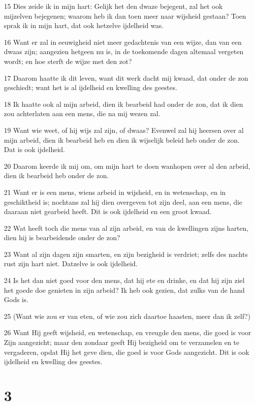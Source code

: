 \par 15 Dies zeide ik in mijn hart: Gelijk het den dwaze bejegent, zal het ook mijzelven bejegenen; waarom heb ik dan toen meer naar wijsheid gestaan? Toen sprak ik in mijn hart, dat ook hetzelve ijdelheid was.
\par 16 Want er zal in eeuwigheid niet meer gedachtenis van een wijze, dan van een dwaas zijn; aangezien hetgeen nu is, in de toekomende dagen altemaal vergeten wordt; en hoe sterft de wijze met den zot?
\par 17 Daarom haatte ik dit leven, want dit werk dacht mij kwaad, dat onder de zon geschiedt; want het is al ijdelheid en kwelling des geestes.
\par 18 Ik haatte ook al mijn arbeid, dien ik bearbeid had onder de zon, dat ik dien zou achterlaten aan een mens, die na mij wezen zal.
\par 19 Want wie weet, of hij wijs zal zijn, of dwaas? Evenwel zal hij heersen over al mijn arbeid, dien ik bearbeid heb en dien ik wijselijk beleid heb onder de zon. Dat is ook ijdelheid.
\par 20 Daarom keerde ik mij om, om mijn hart te doen wanhopen over al den arbeid, dien ik bearbeid heb onder de zon.
\par 21 Want er is een mens, wiens arbeid in wijsheid, en in wetenschap, en in geschiktheid is; nochtans zal hij dien overgeven tot zijn deel, aan een mens, die daaraan niet gearbeid heeft. Dit is ook ijdelheid en een groot kwaad.
\par 22 Wat heeft toch die mens van al zijn arbeid, en van de kwellingen zijns harten, dien hij is bearbeidende onder de zon?
\par 23 Want al zijn dagen zijn smarten, en zijn bezigheid is verdriet; zelfs des nachts rust zijn hart niet. Datzelve is ook ijdelheid.
\par 24 Is het dan niet goed voor den mens, dat hij ete en drinke, en dat hij zijn ziel het goede doe genieten in zijn arbeid? Ik heb ook gezien, dat zulks van de hand Gods is.
\par 25 (Want wie zou er van eten, of wie zou zich daartoe haasten, meer dan ik zelf?)
\par 26 Want Hij geeft wijsheid, en wetenschap, en vreugde den mens, die goed is voor Zijn aangezicht; maar den zondaar geeft Hij bezigheid om te verzamelen en te vergaderen, opdat Hij het geve dien, die goed is voor Gods aangezicht. Dit is ook ijdelheid en kwelling des geestes.

\chapter{3}

